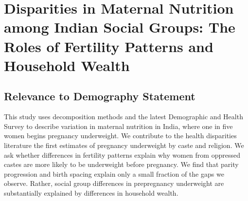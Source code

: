 \documentclass[12pt]{article}
\begin{document}
 
\section*{Disparities in Maternal Nutrition among Indian Social Groups: The Roles of Fertility Patterns and Household Wealth} 

\subsection*{Relevance to Demography Statement}

\vspace{0.25cm}

\noindent This study uses decomposition methods and the latest Demographic and Health Survey to describe variation in maternal nutrition in India, where one in five women begins pregnancy underweight. We contribute to the health disparities literature the first estimates of pregnancy underweight by caste and religion.  We ask whether differences in fertility patterns explain why women from oppressed castes are more likely to be underweight before pregnancy.  We find that parity progression and birth spacing explain only a small fraction of the gaps we observe.  Rather, social group differences in prepregnancy underweight are substantially explained by differences in household wealth. 

\newpage
\doublespacing
\end{document}
